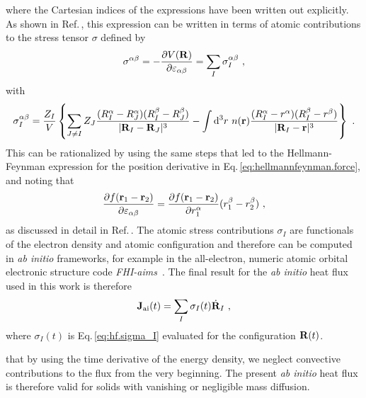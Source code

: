 where the Cartesian indices of the expressions have been written out explicitly.
As shown in Ref.\,\cite{Carbogno2016}, this expression can be written in terms of atomic contributions to the stress tensor $\sigma$ defined by
\begin{align}
  \sigma^{\alpha \beta} 
    = - \frac{\partial V ({\bf R})}{\partial \varepsilon_{\alpha \beta}}
    = \sum_I \sigma_I^{\alpha \beta}~,
  \label{eq:hf.sigma}
\end{align}
with
\begin{align}
  \sigma_I^{\alpha \beta}
    = \frac{Z_I}{V}
        \left\{ 
        \sum_{J \neq I} Z_J \frac{(R_I^\alpha - R_J^\alpha) (R_I^\beta - R_J^\beta)}{\lvert \b R_I - \b R_J \rvert^3}
        - \int \d^3 r ~ n(\b r) \frac{(R_I^\alpha - r^\alpha) (R_I^\beta - r^\beta)}{\lvert \b R_I - \b r \vert^3}
        \right\}~.
  \label{eq:hf.sigma_I}
\end{align}
This can be rationalized by using the same steps that led to the Hellmann-Feynman expression for the position derivative in Eq.\,\eqref{eq:hellmannfeynman.force}, and noting that
\begin{align}
  \frac{\partial f (\b r_1 - \b r_2)}{\partial \varepsilon_{\alpha \beta}}
    = \frac{\partial f (\b r_1 - \b r_2)}{\partial r_1^\alpha} (r_1^\beta - r_2 ^\beta)~,
  \label{eq:strain.derivative}
\end{align}
as discussed in detail in Ref.\,\cite{Knuth2015}.
The atomic stress contributions $\sigma_I$ are functionals of the electron density and atomic configuration and therefore can be computed in \emph{ab initio} frameworks, for example in the all-electron, numeric atomic orbital electronic structure code \emph{FHI-aims}~\cite{FHI-aims,Knuth2015}. 
The final result for the \emph{ab initio} heat flux used in this work is therefore
\begin{align}
	{\bf J}_{\rm ai} (t) = \sum_I \sigma_I (t) \dot{\bf R}_I~,
	\label{eq:J_ai}
\end{align}
where $\sigma_I (t)$ is Eq.\,\eqref{eq:hf.sigma_I} evaluated for the configuration ${\bf R} (t)$.

 that by using the time derivative of the energy density, we neglect convective contributions to the flux from the very beginning. The present \emph{ab initio} heat flux is therefore valid for solids with vanishing or negligible mass diffusion.


